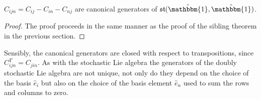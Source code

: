 
\begin{theorem}
	$C_{ijn} = C_{ij} - C_{in} - C_{nj}$ are canonical generators of $\mathfrak{st}(\hat{\mathbbm{1}}, \hat{\mathbbm{1}})$.
\end{theorem}

\begin{proof}
	The proof proceeds in the same manner as the proof of the sibling theorem in
	the previous section.
\end{proof}

Sensibly, the canonical generators are closed with respect to transpositions, 
since $C_{ijn}^T = C_{jin}$. As with the stochastic Lie algebra the generators 
of the doubly stochastic Lie algebra are not unique, not only do they depend on 
the choice of the basis $\hat{e}_i$ but also on the choice of the basis element 
$\hat{e}_n$ used to sum the rows and columns to zero.

